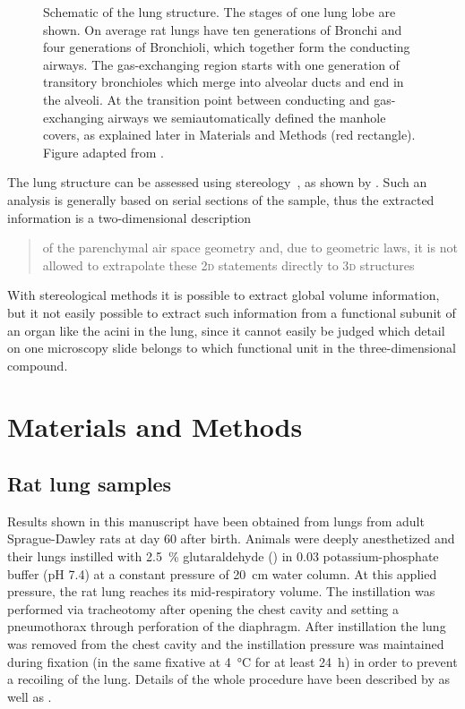 \documentclass[%
	paper=a4,%
	abstract=true,%
	]{scrartcl}
\newlength\imagescale		%
\newcommand{\twod}{2\textsc{d}\xspace}
\newcommand{\threed}{3\textsc{d}\xspace}
\begin{document}
\begin{figure}
%
	\caption{Schematic of the lung structure. The stages of one lung lobe are shown. On average rat lungs have ten generations of Bronchi and four generations of Bronchioli, which together form the conducting airways. The gas-exchanging region starts with one generation of transitory bronchioles which merge into alveolar ducts and end in the alveoli. At the transition point between conducting and gas-exchanging airways we semiautomatically defined the manhole covers, as explained later in Materials and Methods (red rectangle). Figure adapted from \cite{Schittny2007a}.}
	\label{fig:lung schematic}%
\end{figure}

The lung structure can be assessed using stereology~\cite{Hsia2010}, as shown by \citet{Tschanz2002}. Such an analysis is generally based on serial sections of the sample, thus the extracted information is a two-dimensional description \blockquote[\cite{Tschanz2002}]{of the parenchymal air space geometry and, due to geometric laws, it is not allowed to extrapolate these \twod statements directly to \threed structures}. With stereological methods it is possible to extract global volume information, but it not easily possible to extract such information from a functional subunit of an organ like the acini in the lung, since it cannot easily be judged which detail on one microscopy slide belongs to which functional unit in the three-dimensional compound.

\section{Materials and Methods\label{sec:MM}}
\subsection{Rat lung samples}
Results shown in this manuscript have been obtained from lungs from adult Sprague-Dawley rats at day 60 after birth. Animals were deeply anesthetized and their lungs instilled with \SI{2.5}{\percent} glutaraldehyde () in \SI{0.03}{\Molar} potassium-phosphate buffer (pH 7.4) at a constant pressure of \SI{20}{\centi\meter} water column. At this applied pressure, the rat lung reaches its mid-respiratory volume. The instillation was performed via tracheotomy after opening the chest cavity and setting a pneumothorax through perforation of the diaphragm. After instillation the lung was removed from the chest cavity and the instillation pressure was maintained during fixation (in the same fixative at \SI{4}{\celsius} for at least \SI{24}{\hour}) in order to prevent a recoiling of the lung. Details of the whole procedure have been described by \citet{Tschanz2002} as well as \citet{Burri1974}.
\end{document}
